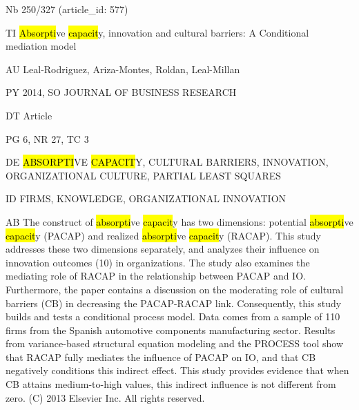 \documentclass[a4paper]{article}
\begin{document}
\vspace*{-2cm}
Nb \tabto{0cm}250/327 (article\_id: 577)\par
TI \tabto{0cm}\hl{Absorpti}ve \hl{capacit}y, innovation and cultural barriers: A Conditional mediation model\par
AU \tabto{0cm}Leal-Rodriguez, Ariza-Montes, Roldan, Leal-Millan\par
PY \tabto{0cm}2014, SO JOURNAL OF BUSINESS RESEARCH\par
DT \tabto{0cm}Article\par
PG \tabto{0cm}6, NR 27, TC 3\par
DE \tabto{0cm}\hl{ABSORPTI}VE \hl{CAPACIT}Y, CULTURAL BARRIERS, INNOVATION, ORGANIZATIONAL CULTURE, PARTIAL LEAST SQUARES\par
ID \tabto{0cm}FIRMS, KNOWLEDGE, ORGANIZATIONAL INNOVATION\par
AB \tabto{0cm}The construct of \hl{absorpti}ve \hl{capacit}y has two dimensions: potential \hl{absorpti}ve \hl{capacit}y (PACAP) and realized \hl{absorpti}ve \hl{capacit}y (RACAP). This study addresses these two dimensions separately, and analyzes their influence on innovation outcomes (10) in organizations. The study also examines the mediating role of RACAP in the relationship between PACAP and IO. Furthermore, the paper contains a discussion on the moderating role of cultural barriers (CB) in decreasing the PACAP-RACAP link. Consequently, this study builds and tests a conditional process model. Data comes from a sample of 110 firms from the Spanish automotive components manufacturing sector. Results from variance-based structural equation modeling and the PROCESS tool show that RACAP fully mediates the influence of PACAP on IO, and that CB negatively conditions this indirect effect. This study provides evidence that when CB attains medium-to-high values, this indirect influence is not different from zero. (C) 2013 Elsevier Inc. All rights reserved.\par
\clearpage
\end{document}
